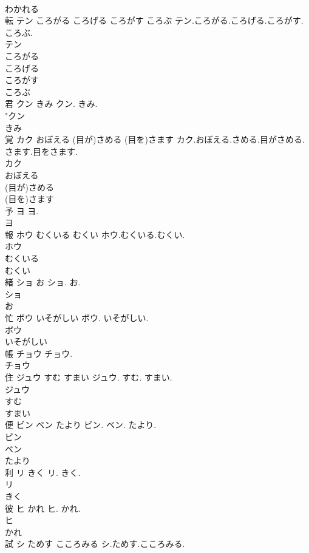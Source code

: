 \documentclass[8pt]{extreport}
\begin{document}
\begin{CJK}{UTF8}{min}
\\	わかれる
\\	転	テン ころがる ころげる ころがす ころぶ	テン.ころがる.ころげる.ころがす.ころぶ.	
\\	テン
\\	ころがる
\\	ころげる
\\	ころがす
\\	ころぶ
\\	君	クン きみ	クン. きみ.	
\\	"クン
\\	きみ
\\	覚	カク おぼえる (目が)さめる (目を)さます	カク.おぼえる.さめる.目がさめる.さます.目をさます.	
\\	カク
\\	おぼえる
\\	(目が)さめる
\\	(目を)さます
\\	予	ヨ	ヨ.	
\\	ヨ
\\	報	ホウ むくいる むくい	ホウ.むくいる.むくい.	
\\	ホウ
\\	むくいる
\\	むくい
\\	緒	ショ お	ショ. お.	
\\	ショ
\\	お
\\	忙	ボウ いそがしい	ボウ. いそがしい.	
\\	ボウ
\\	いそがしい
\\	帳	チョウ	チョウ.	
\\	チョウ
\\	住	ジュウ すむ すまい	ジュウ. すむ. すまい.	
\\	ジュウ
\\	すむ
\\	すまい
\\	便	ビン ベン たより	ビン. ベン. たより.	
\\	ビン
\\	ベン
\\	たより
\\	利	リ きく	リ. きく.	
\\	リ
\\	きく
\\	彼	ヒ かれ	ヒ. かれ.	
\\	ヒ
\\	かれ
\\	試	シ ためす こころみる	シ.ためす.こころみる.	

\end{CJK}
\end{document}
